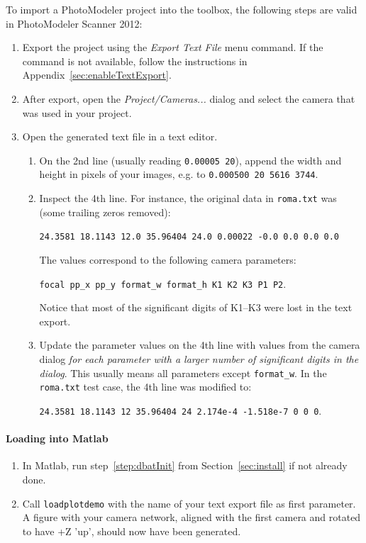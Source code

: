 \documentclass{article}
\begin{document}
To import a PhotoModeler project into the toolbox, the following
steps are valid in PhotoModeler Scanner 2012:

\begin{enumerate}
\item Export the project using the \emph{Export Text File} menu
  command. If the command is not available, follow the instructions in
  Appendix~\ref{sec:enableTextExport}.
\item After export, open the \emph{Project/Cameras...} dialog and
  select the camera that was used in your project.
\item Open the generated text file in a text editor.
  \begin{enumerate}
  \item On the 2nd line (usually reading \texttt{0.00005 20}), append
    the width and height in pixels of your images, e.g. to
    \texttt{0.000500 20 5616 3744}.
  \item Inspect the 4th line. For instance,
    the original data in \texttt{roma.txt} was (some trailing zeros removed):

    \texttt{24.3581 18.1143 12.0 35.96404 24.0 0.00022 -0.0 0.0 0.0 0.0}

    The values correspond to the following camera parameters:

    \texttt{focal pp\_x pp\_y format\_w format\_h K1 K2 K3 P1 P2}.

    Notice that most of the significant digits of K1--K3 were lost in
    the text export.
  \item Update the parameter values on the 4th line with values from
    the camera dialog \emph{for each parameter with a larger number of
      significant digits in the dialog}. This usually means all
    parameters except \texttt{format\_w}. In the \texttt{roma.txt}
    test case, the 4th line was modified to:

    \texttt{24.3581 18.1143 12 35.96404 24 2.174e-4 -1.518e-7 0 0 0}.

  \end{enumerate}
\end{enumerate}

\paragraph{Loading into Matlab}

\begin{enumerate}
\item In Matlab, run step~\ref{step:dbatInit} from
  Section~\ref{sec:install} if not already done.
\item Call \texttt{loadplotdemo} with the name of your text export
  file as first parameter. A figure with your camera network, aligned
  with the first camera and rotated to have +Z 'up', should now have
  been generated.
\end{enumerate}
\end{document}
